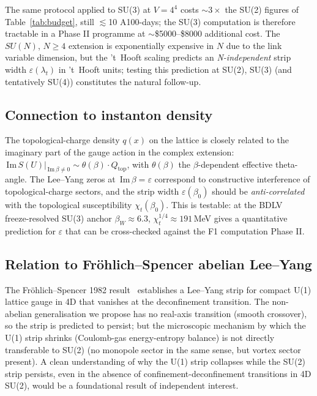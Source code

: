 \documentclass[11pt,a4paper]{article}
\theoremstyle{definition}
\theoremstyle{remark}
\newcommand{\sgnIm}{\,\mathrm{Im}\,}
\begin{document}
The same protocol applied to SU(3) at $V = 4^4$ costs $\sim 3 \times$
the SU(2) figures of Table~\ref{tab:budget}, still
$\lesssim$10 A100-days; the SU(3) computation is therefore tractable
in a Phase II programme at $\sim$\$5000--\$8000 additional cost.
The $SU(N)$, $N \ge 4$ extension is exponentially expensive in $N$
due to the link variable dimension, but the 't~Hooft scaling
predicts an \emph{N-independent} strip width
$\varepsilon(\lambda_t)$ in 't~Hooft units; testing this prediction
at SU(2), SU(3) (and tentatively SU(4)) constitutes the natural
follow-up.

\subsection{Connection to instanton density}

The topological-charge density $q(x)$ on the lattice is closely
related to the imaginary part of the gauge action in the complex
extension: $\sgnIm S(U)|_{\sgnIm\beta \neq 0} \sim
\theta(\beta) \cdot Q_{\mathrm{top}}$, with $\theta(\beta)$ the
$\beta$-dependent effective theta-angle. The Lee--Yang zeros at
$\sgnIm\beta = \varepsilon$ correspond to constructive interference
of topological-charge sectors, and the strip width
$\varepsilon(\beta_0)$ should be \emph{anti-correlated} with the
topological susceptibility $\chi_t(\beta_0)$. This is testable:
at the BDLV~\cite{BDLV2022} freeze-resolved SU(3) anchor
$\beta_W \approx 6.3$, $\chi_t^{1/4} \approx 191$\,MeV gives a
quantitative prediction for $\varepsilon$ that can be cross-checked
against the F1 computation Phase II.

\subsection{Relation to Fr\"ohlich--Spencer abelian Lee--Yang}

The Fr\"ohlich--Spencer 1982 result~\cite{FroehlichSpencer1982}
establishes a Lee--Yang strip for compact U(1) lattice gauge in 4D
that vanishes at the deconfinement transition. The non-abelian
generalisation we propose has no real-axis transition (smooth
crossover), so the strip is predicted to persist; but the
microscopic mechanism by which the U(1) strip shrinks (Coulomb-gas
energy-entropy balance) is not directly transferable to SU(2)
(no monopole sector in the same sense, but vortex sector
\cite{tHooft1978vortex} present). A clean understanding of why
the U(1) strip collapses while the SU(2) strip persists, even in
the absence of confinement-deconfinement transitions in 4D
SU(2), would be a foundational result of independent interest.
\end{document}
